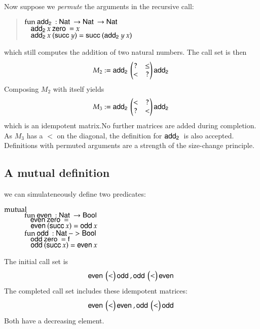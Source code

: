 \noindent Now suppose we \emph{permute} the arguments in the recursive call:
\begin{quote}
$\mathrm{fun}\: \mathsf{add_2}\: : \mathsf{Nat}\: \rightarrow \mathsf{Nat}\: \rightarrow \mathsf{Nat}\:$\\
$\hspace*{3mm} \mathsf{add_2}\: x \: \mathsf{zero}\: = x $\\
$\hspace*{3mm} \mathsf{add_2}\: x \: (\mathsf{succ}\: y) = \mathsf{succ}\: (\mathsf{add_2}\: y \: x)  $
\end{quote}
which still computes the addition of two natural numbers.
\noindent The call set is then 
\[
M_2 := \mathsf{add_2}\:\begin{pmatrix}

? & \leq \\
< & ?   \\
\end{pmatrix}\mathsf{add_2}\:
\]
Composing $M_2$ with itself yields
\[
M_3 := \mathsf{add_2}\: \begin{pmatrix}
< & ?    \\
? & <    \\
\end{pmatrix} \mathsf{add_2}\:
\] 
which is an idempotent matrix.No further matrices are added during completion.
As $M_3$ has a $<$ on the diagonal, the definition for $\mathsf{add_2}\:$ is also accepted.
Definitions with permuted arguments are a strength of the size-change principle.  

\subsection{A mutual definition}

we can simulateneously define two predicates:
\begin{bsp}
$\mathrm{mutual}\:$\\
$\spcx \fun \even : \Nat \ra \Bool$\\
$\spcx \spc \even \zero = \tt $\\
$\spcx \spc \even (\suc x) = \odd x $\\
$\spcx \fun \odd : \Nat -> \Bool$\\
$\spcx \spc \odd \zero = \ff$\\
$\spcx \spc \odd (\suc x) = \even x$
\end{bsp}
The initial call set is 
\[
\mathsf{even}\: \begin{pmatrix}
< \\
\end{pmatrix}\mathsf{odd}\:
, 
\mathsf{odd}\: \begin{pmatrix}
< \\
\end{pmatrix}\mathsf{even}\:
\] 
\noindent The completed call set includes these idempotent matrices:
\[
\mathsf{even}\: \begin{pmatrix}
< \\
\end{pmatrix}\mathsf{even}\:
, 
\mathsf{odd}\: \begin{pmatrix}
< \\
\end{pmatrix}\mathsf{odd}\:
\] 
Both have a decreasing element.
